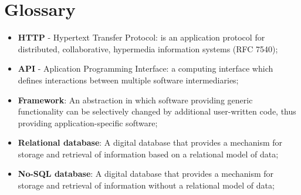 \chapter*{Glossary}

\begin{itemize}
    \item \textbf{HTTP} - Hypertext Transfer Protocol: is an application protocol for distributed,
     collaborative, hypermedia information systems (RFC 7540);
    \item \textbf{API} - Aplication Programming Interface: a computing interface which defines
     interactions between multiple software intermediaries;
    \item \textbf{Framework}: An abstraction in which software providing generic functionality can
     be selectively changed by additional user-written code,
     thus providing application-specific software;
     \item \textbf{Relational database}: A digital database that provides a mechanism for storage and
     retrieval of information based on a relational model of data;
     \item \textbf{No-SQL database}: A digital database that provides a mechanism for storage and
     retrieval of information without a relational model of data;
\end{itemize}
